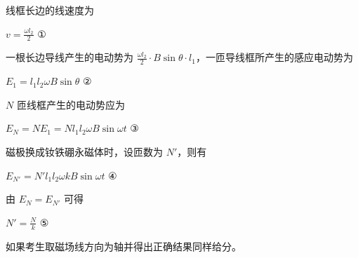 \documentclass[\gkver]{gaokaozhenti}
\begin{document}
\begin{enumerate}
{

线框长边的线速度为

$v=\frac{\omega l_{2}}{2}$ ①

一根长边导线产生的电动势为 $\frac{\omega l_{2}}{2}\cdot B\sin\theta\cdot l_{1}$，一匝导线框所产生的感应电动势为

$E_{1}=l_{1}l_{2}\omega B\sin\theta$ ②

$N$ 匝线框产生的电动势应为

$E_{N}=NE_{1}=Nl_{1}l_{2}\omega B\sin\omega t$ ③

磁极换成钕铁硼永磁体时，设匝数为 $N'$，则有

$E_{N'}=N'l_{1}l_{2}\omega kB\sin\omega t$ ④

由 $E_{N}=E_{N'}$ 可得

$N'=\frac{N}{k}$ ⑤

如果考生取磁场线方向为轴并得出正确结果同样给分。
}

\end{enumerate}
\end{document}

